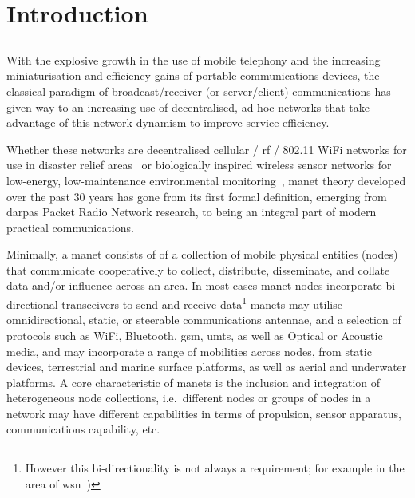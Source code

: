
\chapter{Introduction}
\label{ch:introduction}

\section{}\label{manets}

With the explosive growth in the use of mobile telephony and the increasing miniaturisation and efficiency gains of portable communications devices, the classical paradigm of broadcast/receiver (or server/client) communications has given way to an increasing use of decentralised, ad-hoc networks that take advantage of this network dynamism to improve service efficiency.

Whether these networks are decentralised cellular / \gls{rf} / 802.11 WiFi networks for use in disaster relief areas~\cite{Milliken2015} or biologically inspired wireless sensor networks for low-energy, low-maintenance environmental monitoring~\cite{Nicholson2008,Selvakennedy2007}, \gls{manet} theory developed over the past 30 years has gone from its first formal definition, emerging from \glspl{darpa} Packet Radio Network research, to being an integral part of modern practical communications\cite{Jubin1987}.

Minimally, a \gls{manet} consists of of a collection of mobile physical entities (nodes) that communicate cooperatively to collect, distribute, disseminate, and collate data and/or influence across an area.
In most cases \gls{manet} nodes incorporate bi-directional transceivers to send and receive data\footnote{However this bi-directionality is not always a requirement; for example in the area of \gls{wsn}~\cite{Akyildiz2002})}
\glspl{manet} may utilise omnidirectional, static, or steerable communications antennae, and a selection of protocols such as WiFi, Bluetooth, \gls{gsm}, \gls{umts}, as well as Optical or Acoustic media, and may incorporate a range of mobilities across nodes, from static devices, terrestrial and marine surface platforms, as well as aerial and underwater platforms.
A core characteristic of \glspl{manet} is the inclusion and integration of heterogeneous node collections, i.e.\ different nodes or groups of nodes in a network may have different capabilities in terms of propulsion, sensor apparatus, communications capability, etc.

